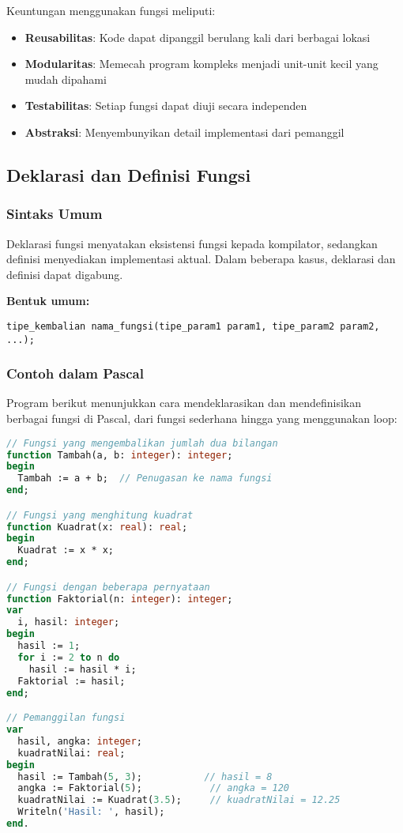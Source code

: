 \documentclass[../main.tex]{subfiles}
\begin{document}
Keuntungan menggunakan fungsi meliputi:
\begin{itemize}
  \item \textbf{Reusabilitas}: Kode dapat dipanggil berulang kali dari berbagai lokasi
  \item \textbf{Modularitas}: Memecah program kompleks menjadi unit-unit kecil yang mudah dipahami
  \item \textbf{Testabilitas}: Setiap fungsi dapat diuji secara independen
  \item \textbf{Abstraksi}: Menyembunyikan detail implementasi dari pemanggil
\end{itemize}

\subsection{Deklarasi dan Definisi Fungsi}
\subsubsection{Sintaks Umum}
Deklarasi fungsi menyatakan eksistensi fungsi kepada kompilator, sedangkan definisi menyediakan implementasi aktual. Dalam beberapa kasus, deklarasi dan definisi dapat digabung.

\textbf{Bentuk umum:}
\begin{verbatim}
tipe_kembalian nama_fungsi(tipe_param1 param1, tipe_param2 param2, ...);
\end{verbatim}

\subsubsection{Contoh dalam Pascal}

Program berikut menunjukkan cara mendeklarasikan dan mendefinisikan berbagai fungsi di Pascal, dari fungsi sederhana hingga yang menggunakan loop:

\begin{lstlisting}[language=Pascal, caption={Deklarasi dan definisi fungsi (Pascal)}]
// Fungsi yang mengembalikan jumlah dua bilangan
function Tambah(a, b: integer): integer;
begin
  Tambah := a + b;  // Penugasan ke nama fungsi
end;

// Fungsi yang menghitung kuadrat
function Kuadrat(x: real): real;
begin
  Kuadrat := x * x;
end;

// Fungsi dengan beberapa pernyataan
function Faktorial(n: integer): integer;
var
  i, hasil: integer;
begin
  hasil := 1;
  for i := 2 to n do
    hasil := hasil * i;
  Faktorial := hasil;
end;

// Pemanggilan fungsi
var
  hasil, angka: integer;
  kuadratNilai: real;
begin
  hasil := Tambah(5, 3);           // hasil = 8
  angka := Faktorial(5);            // angka = 120
  kuadratNilai := Kuadrat(3.5);     // kuadratNilai = 12.25
  Writeln('Hasil: ', hasil);
end.
\end{lstlisting}
\end{document}
